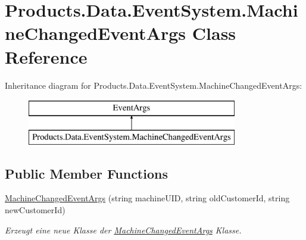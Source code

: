 \hypertarget{class_products_1_1_data_1_1_event_system_1_1_machine_changed_event_args}{}\section{Products.\+Data.\+Event\+System.\+Machine\+Changed\+Event\+Args Class Reference}
\label{class_products_1_1_data_1_1_event_system_1_1_machine_changed_event_args}
Inheritance diagram for Products.\+Data.\+Event\+System.\+Machine\+Changed\+Event\+Args\+:\begin{figure}[H]
\begin{center}
\leavevmode
\includegraphics[height=2.000000cm]{class_products_1_1_data_1_1_event_system_1_1_machine_changed_event_args}
\end{center}
\end{figure}
\subsection*{Public Member Functions}
\begin{DoxyCompactItemize}
\item 
\hyperlink{class_products_1_1_data_1_1_event_system_1_1_machine_changed_event_args_af3742a993b8070dd9f9af1ae107ba198}{Machine\+Changed\+Event\+Args} (string machine\+U\+ID, string old\+Customer\+Id, string new\+Customer\+Id)
\begin{DoxyCompactList}\small\item\em Erzeugt eine neue Klasse der \hyperlink{class_products_1_1_data_1_1_event_system_1_1_machine_changed_event_args}{Machine\+Changed\+Event\+Args} Klasse. \end{DoxyCompactList}\end{DoxyCompactItemize}
